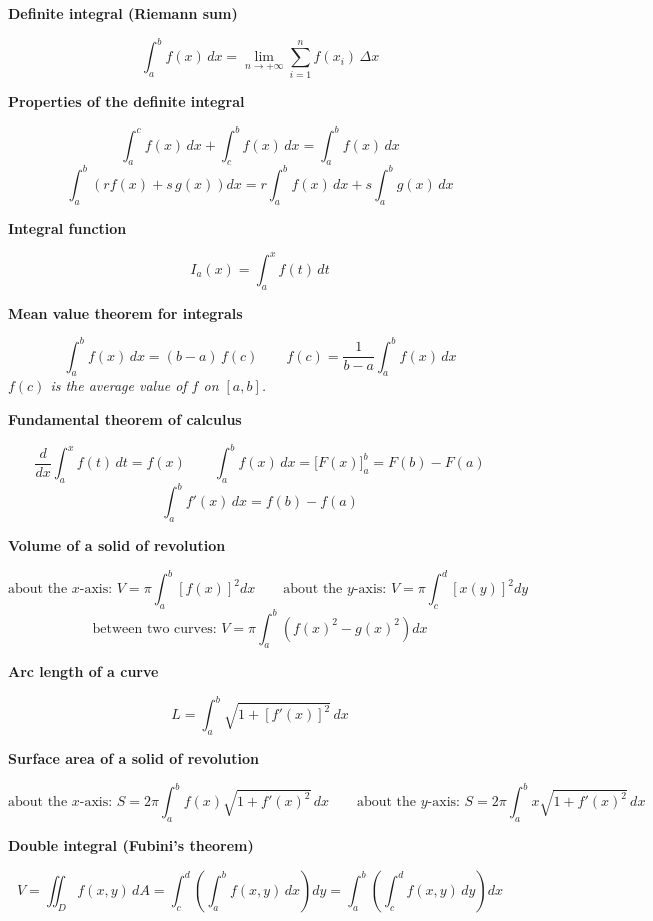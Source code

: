 \documentclass[11pt]{article}
\newcommand{\sub}[1]{\par\medskip\textbf{#1}\par}
\newcommand{\expl}[1]{{\color{gray}\itshape #1}\par}
\begin{document}
\sub{Definite integral (Riemann sum)}
\[ \int_a^b f(x)\,dx = \lim_{n\to +\infty} \sum_{i=1}^{n} f(x_i)\,\Delta x \]

\sub{Properties of the definite integral}
\[ \int_a^c f(x)\,dx + \int_c^b f(x)\,dx = \int_a^b f(x)\,dx \]
\[ \int_a^b \left(r f(x) + s\,g(x)\right)dx = r\int_a^b f(x)\,dx + s\int_a^b g(x)\,dx \]

\sub{Integral function}
\[ I_a(x) = \int_a^x f(t)\,dt \]

\sub{Mean value theorem for integrals}
\[ \int_a^b f(x)\,dx = (b - a)\,f(c) \qquad f(c) = \frac{1}{b - a}\int_a^b f(x)\,dx \]
\expl{$f(c)$ is the average value of $f$ on $[a, b]$.}

\sub{Fundamental theorem of calculus}
\[ \frac{d}{dx}\int_a^x f(t)\,dt = f(x) \qquad \int_a^b f(x)\,dx = \Big[F(x)\Big]_a^b = F(b) - F(a) \]
\[ \int_a^b f'(x)\,dx = f(b) - f(a) \]

\sub{Volume of a solid of revolution}
\[ \text{about the } x\text{-axis: } V = \pi\int_a^b \left[f(x)\right]^2 dx \qquad \text{about the } y\text{-axis: } V = \pi\int_c^d \left[x(y)\right]^2 dy \]
\[ \text{between two curves: } V = \pi\int_a^b \left(f(x)^2 - g(x)^2\right)dx \]

\sub{Arc length of a curve}
\[ L = \int_a^b \sqrt{1 + \left[f'(x)\right]^2}\,dx \]

\sub{Surface area of a solid of revolution}
\[ \text{about the } x\text{-axis: } S = 2\pi\int_a^b f(x)\sqrt{1 + f'(x)^2}\,dx \qquad \text{about the } y\text{-axis: } S = 2\pi\int_a^b x\sqrt{1 + f'(x)^2}\,dx \]

\sub{Double integral (Fubini's theorem)}
\[ V = \iint_D f(x, y)\,dA = \int_c^d \left(\int_a^b f(x, y)\,dx\right)dy = \int_a^b \left(\int_c^d f(x, y)\,dy\right)dx \]
\end{document}
